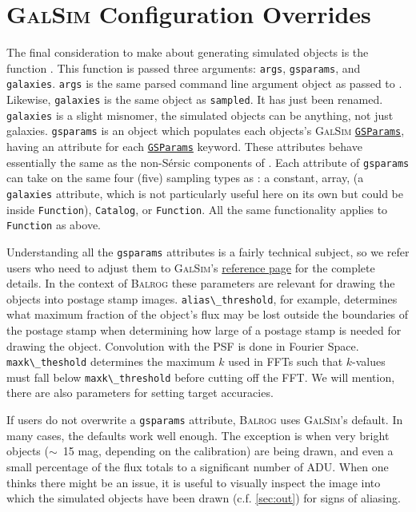 \documentclass[11pt]{book}
\newcommand{\codett}[1]{\lstinline{#1}}
\newcommand{\galsim}{\textsc{GalSim}}
\newcommand{\balrog}{\textsc{Balrog}}
\newcommand{\sersic}{S\'{e}rsic}
\begin{document}
\section{\galsim{} Configuration Overrides}
\label{sec:gsparams}

The final consideration to make about generating simulated objects is the function \gspfunc{}.
This function is passed three arguments: \codett{args}, \codett{gsparams}, and \codett{galaxies}.
\codett{args} is the same parsed command line argument object as passed to \simfunc{}.
Likewise, \codett{galaxies} is the same object as \codett{sampled}.
It has just been renamed.
\codett{galaxies} is a slight misnomer, the simulated objects can be anything, not just galaxies.
\codett{gsparams} is an object which populates each objects's \galsim{} 
\href{http://galsim-developers.github.io/GalSim/structgalsim\_1\_1\_g\_s\_params.html}{\texttt{GSParams}}, having an attribute for each  
\href{http://galsim-developers.github.io/GalSim/structgalsim\_1\_1\_g\_s\_params.html}{\texttt{GSParams}} keyword.
These attributes behave essentially the same as the non-\sersic{} components of \simrules{}.
Each attribute of \codett{gsparams} can take on the same four (five) sampling types as \simrules{}:
a constant, array, (a \codett{galaxies} attribute, which is not particularly useful here on its own but could be
inside \codett{Function}), \codett{Catalog}, or \codett{Function}.
All the same functionality applies to \codett{Function} as above.

Understanding all the \codett{gsparams} attributes is a fairly technical subject, so we
refer users who need to adjust them to 
\galsim{}'s \href{http://galsim-developers.github.io/GalSim/structgalsim\_1\_1\_g\_s\_params.html}{reference page}
for the complete details.
In the context of \balrog{} these parameters are relevant for drawing the objects into postage stamp images.
\codett{alias\_threshold}, for example, determines what maximum fraction of the object's flux may be lost outside the boundaries
of the postage stamp when determining how large of a postage stamp is needed for drawing the object.
Convolution with the PSF is done in Fourier Space.
\codett{maxk\_theshold} determines the maximum $k$ used in FFTs such that $k$-values must fall below \codett{maxk\_threshold}
before cutting off the FFT. We will mention, there are also parameters for setting target accuracies.

If users do not overwrite a \codett{gsparams} attribute, \balrog{} uses \galsim{}'s default.
In many cases, the defaults work well enough. The exception is when very bright objects ($\sim$~15 mag, depending on the calibration)
are being drawn, and even a small percentage of the flux totals to a significant number of ADU.
When one thinks there might be an issue, 
it is useful to visually inspect the image into which the simulated objects have been drawn (c.f. \autoref{sec:out})
for signs of aliasing.
\end{document}

